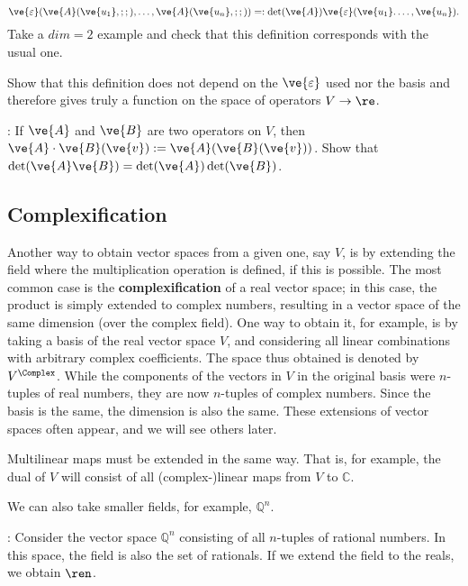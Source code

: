 \[ 
\ve{\varepsilon}(\ve{A}(\ve{u_1},;;),\ldots ,\ve{A}(\ve{u_n},;;)) =: \det(\ve{A}) \ve{\varepsilon}(\ve{u_1}. \ldots, \ve{u_n}).
\] 
%
Take a $dim=2$ example and check that this definition corresponds with the usual one.

\bpro Show that this definition does not depend on the $\ve{\varepsilon} $ used nor the basis and therefore gives truly a function on the space of operators $V \to \re$. \epro

\ejer: If $\ve{A}$ and $\ve{B}$ are two operators on $V$, then $\ve{A}\cdot \ve{B} (\ve{v}):= \ve{A}(\ve{B}(\ve{v}))$. Show that $\det(\ve{A}\ve{B})=\det(\ve{A}) \det(\ve{B})$.

\subsection{Complexification}
\label{sub:Complexificacion}


Another way to obtain vector spaces from a given one, say $V$, is by extending the field where 
the multiplication operation is defined, if this is possible. 
The most common case is the \textbf{complexification} of a real vector space; 
in this case, the product is simply extended to complex numbers, resulting in a vector space 
of the same dimension (over the complex field). 
One way to obtain it, for example, is by taking a basis of the real vector space $V$, and 
considering all linear combinations with arbitrary complex coefficients. 
The space thus obtained is denoted by $V^{\Complex}$. 
While the components of the vectors in $V$ in the original basis were $n$-tuples of real numbers, 
they are now $n$-tuples of complex numbers. 
Since the basis is the same, the dimension is also the same. 
These extensions of vector spaces often appear, and we will see others later.

Multilinear maps must be extended in the same way. 
That is, for example, the dual of $V$ will consist of all (complex-)linear maps from $V$ to $\mathbb{C}$.

We can also take smaller fields, for example, $\mathbb{Q}^n$.

\ejem: Consider the vector space $\mathbb{Q}^n$ consisting of all $n$-tuples of rational numbers. 
In this space, the field is also the set of rationals. 
If we extend the field to the reals, we obtain $\ren$.

